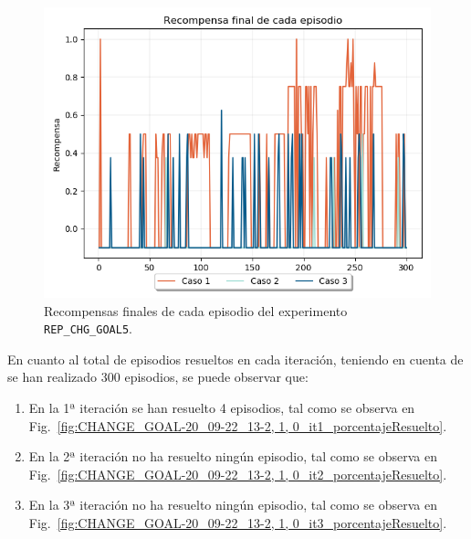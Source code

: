 \begin{figure}
    \centering
    \includegraphics[scale=0.4]{cap5_experimentacion/images/CHANGE_GOAL-20_09-22_13-2, 1, 0_recompensa.png}
    \caption{Recompensas finales de cada episodio del experimento \texttt{REP\_CHG\_GOAL5}.}
    \label{fig:CHANGE_GOAL-20_09-22_13-2, 1, 0_recompensa}
\end{figure}

En cuanto al total de episodios resueltos en cada iteración, teniendo en cuenta de se han realizado 300 episodios, se puede observar que: 
\begin{enumerate}
    \item En la 1ª iteración se han resuelto 4 episodios, tal como se observa en Fig.~\ref{fig:CHANGE_GOAL-20_09-22_13-2, 1, 0_it1_porcentajeResuelto}.
    \item En la 2ª iteración no ha resuelto ningún episodio, tal como se observa en Fig.~\ref{fig:CHANGE_GOAL-20_09-22_13-2, 1, 0_it2_porcentajeResuelto}.
    \item En la 3ª iteración no ha resuelto ningún episodio, tal como se observa en Fig.~\ref{fig:CHANGE_GOAL-20_09-22_13-2, 1, 0_it3_porcentajeResuelto}.
\end{enumerate}

